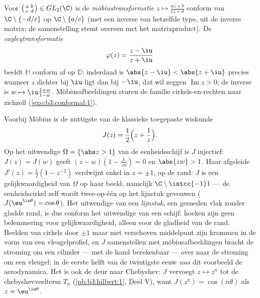 \begin{example}[Möbiustransformaties]
\label{ex:b3:conformal:mobius}
Voor $\bigl(\begin{smallmatrix}a & b\\ c &
d\end{smallmatrix}\bigr) \in GL_2(\C)$ is de
\emph{möbiustransformatie} $z \mapsto
\frac{az + b}{cz + d}$ conform van $\C\setminus\{-d/c\}$ op
$\C\setminus\{a/c\}$ (met een inverse van hetzelfde type, uit de
inverse matrix; de samenstelling stemt overeen met het
matrixproduct). De \emph{cayleytransformatie}
\[
\varphi(z) = \frac{z - \iu}{z + \iu}
\]
beeldt $\mathbb H$ conform af op $\mathbb D$: inderdaad is
$\abs{z - \iu} < \abs{z + \iu}$ precies wanneer $z$ dichter bij
$\iu$ ligt dan bij $-\iu$, dat wil zeggen $\operatorname{Im}z >
0$; de inverse is $w \mapsto \iu\frac{1 + w}{1 - w}$.
Möbiusafbeeldingen sturen de familie cirkels-en-rechten naar
zichzelf (\cref{exo:b3:conformal:1}).
\end{example}

\begin{example}
\label{ex:b3:conformal:joukowski}
Voorbij Möbius is de nuttigste  van de
klassieke toegepaste wiskunde
\[
J(z) = \frac12\Bigl(z + \frac1z\Bigr) .
\]
Op het uitwendige $\Omega = \{\abs z > 1\}$ van de
eenheidsschijf is $J$ injectief: $J(z) = J(w)$ geeft $(z - w)(1 -
\frac1{zw}) = 0$ en $\abs{zw} > 1$. Haar afgeleide $J'(z) =
\frac12(1 - z^{-2})$ verdwijnt enkel in $z = \pm1$, op de rand:
$J$ is een  gelijkwaardigheid van $\Omega$ op haar beeld,
namelijk $\C\setminus\intcc{-1}1$ --- de eenheidscirkel zelf
wordt twee-op-één op het lijnstuk gevouwen
($J(\eu^{\iu\theta}) = \cos\theta$). Het uitwendige van een
\emph{lijnstuk}, een gesneden vlak zonder gladde rand, is dus
conform het uitwendige van een schijf: hoeken zijn geen
belemmering voor  gelijkwaardigheid, alleen voor de
gladheid van de rand. Beelden van cirkels door $\pm1$ maar met
verschoven middelpunt zijn krommen in de vorm van een vleugelprofiel,
en $J$ samenstellen met möbiusafbeeldingen bracht de stroming om
een cilinder --- met de hand berekenbaar --- over naar de
stroming om een vleugel: in de eerste helft van de twintigste eeuw
\emph{was} dit voorbeeld de aerodynamica. Het is ook de deur naar
Chebyshev: $J$ vervoegt $z \mapsto z^n$ tot de chebyshevveelterm
$T_n$ (\cref{pb:b3:hilbert:1}, Deel V), want $J(z^n) =
\cos(n\theta)$ als $z = \eu^{\iu\theta}$.
\end{example}

